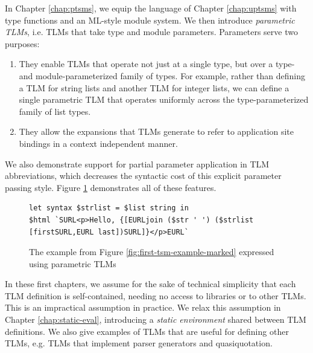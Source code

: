 In Chapter \ref{chap:ptsms}, we equip the language of Chapter \ref{chap:uptsms} with type functions and an ML-style module system. We then introduce \emph{parametric TLMs}, i.e. TLMs that take type and module parameters. Parameters serve two purposes:
\begin{enumerate}
\item They enable TLMs that operate not just at a single type, but over a type- and module-parameterized family of types. For example, rather than defining a TLM  for string lists and another TLM  for integer lists, we can define a single parametric TLM  that operates uniformly across the type-parameterized family of list types. 
\item They allow the expansions that TLMs generate to refer to application site bindings in a context independent manner. 
\end{enumerate}
We also demonstrate support for partial parameter application in TLM abbreviations, which decreases the syntactic cost of this explicit parameter passing style. Figure \ref{fig:first-ptsm-example-marked} demonstrates all of these features.

\begin{figure}[h]
\begin{lstlisting}[numbers=none,xleftmargin=0px]
let syntax $strlist = $list string in 
$html `SURL<p>Hello, {[EURLjoin ($str ' ') ($strlist [firstSURL,EURL last])SURL]}</p>EURL`
\end{lstlisting}
\caption{The example from Figure \ref{fig:first-tsm-example-marked} expressed using parametric TLMs}
\label{fig:first-ptsm-example-marked}
\end{figure}

In these first chapters, we assume for the sake of technical simplicity that each TLM definition is self-contained, needing no access to libraries or to other TLMs. This is an impractical assumption in practice. We relax this assumption in Chapter \ref{chap:static-eval}, introducing a \emph{static environment} shared between TLM definitions. We also give examples of TLMs that are useful for defining other TLMs, e.g. TLMs that implement parser generators and quasiquotation.

